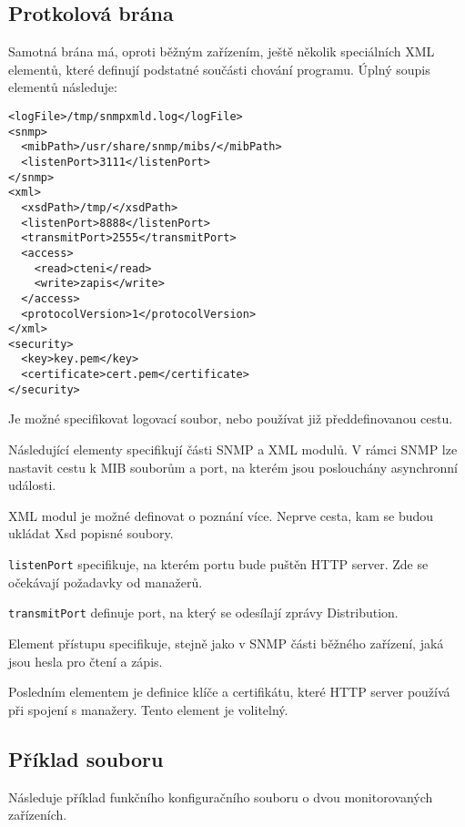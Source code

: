 \subsection*{Protkolová brána}
Samotná brána má, oproti běžným zařízením, ještě několik speciálních XML elementů, které definují podstatné
součásti chování programu. Úplný soupis elementů následuje:

\begin{verbatim}
<logFile>/tmp/snmpxmld.log</logFile>
<snmp>
  <mibPath>/usr/share/snmp/mibs/</mibPath>
  <listenPort>3111</listenPort>
</snmp>
<xml>
  <xsdPath>/tmp/</xsdPath>
  <listenPort>8888</listenPort>
  <transmitPort>2555</transmitPort>
  <access>
    <read>cteni</read>
    <write>zapis</write>
  </access>
  <protocolVersion>1</protocolVersion>
</xml>
<security>
  <key>key.pem</key>
  <certificate>cert.pem</certificate>
</security>
\end{verbatim}

Je možné specifikovat logovací soubor, nebo používat již předdefinovanou cestu.

Následující elementy specifikují části SNMP a XML modulů. V rámci SNMP lze nastavit
cestu k MIB souborům a port, na kterém jsou poslouchány asynchronní události.

XML modul je možné definovat o poznání více. Neprve cesta, kam se budou ukládat
Xsd popisné soubory. 

\verb|listenPort| specifikuje, na kterém portu bude puštěn HTTP server. Zde se očekávají
požadavky od manažerů.

\verb|transmitPort| definuje port, na který se odesílají zprávy Distribution.

Element přístupu specifikuje, stejně jako v SNMP části běžného zařízení, jaká jsou hesla pro
čtení a zápis.

Posledním elementem je definice klíče a certifikátu, které HTTP server používá při spojení s manažery.
Tento element je volitelný.

\subsection*{Příklad souboru}
Následuje příklad funkčního konfiguračního souboru o dvou monitorovaných zařízeních.

